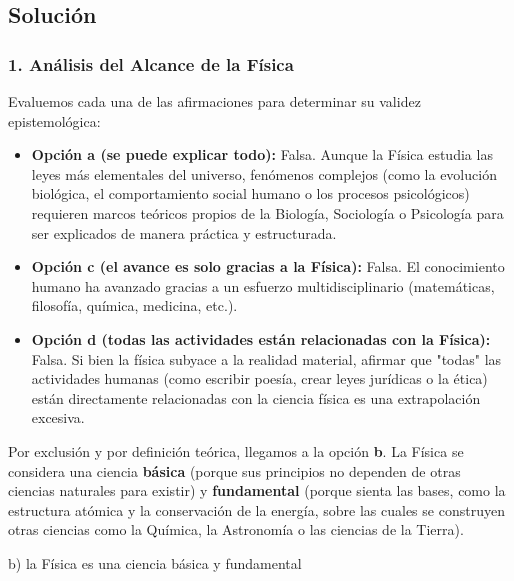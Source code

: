 \documentclass[12pt, a4paper]{article}
\begin{document}
\subsection*{Solución}

\subsubsection*{1. Análisis del Alcance de la Física}
Evaluemos cada una de las afirmaciones para determinar su validez epistemológica:

\begin{itemize}
    \item \textbf{Opción a (se puede explicar todo):} Falsa. Aunque la Física estudia las leyes más elementales del universo, fenómenos complejos (como la evolución biológica, el comportamiento social humano o los procesos psicológicos) requieren marcos teóricos propios de la Biología, Sociología o Psicología para ser explicados de manera práctica y estructurada.
    \item \textbf{Opción c (el avance es solo gracias a la Física):} Falsa. El conocimiento humano ha avanzado gracias a un esfuerzo multidisciplinario (matemáticas, filosofía, química, medicina, etc.).
    \item \textbf{Opción d (todas las actividades están relacionadas con la Física):} Falsa. Si bien la física subyace a la realidad material, afirmar que "todas" las actividades humanas (como escribir poesía, crear leyes jurídicas o la ética) están directamente relacionadas con la ciencia física es una extrapolación excesiva.
\end{itemize}

Por exclusión y por definición teórica, llegamos a la opción \textbf{b}. La Física se considera una ciencia \textbf{básica} (porque sus principios no dependen de otras ciencias naturales para existir) y \textbf{fundamental} (porque sienta las bases, como la estructura atómica y la conservación de la energía, sobre las cuales se construyen otras ciencias como la Química, la Astronomía o las ciencias de la Tierra).

\begin{tcolorbox}[colback=green!5!white, colframe=green!50!black, title=Respuesta Final]
\centering \Large b) la Física es una ciencia básica y fundamental
\end{tcolorbox}
\newpage

\end{document}
